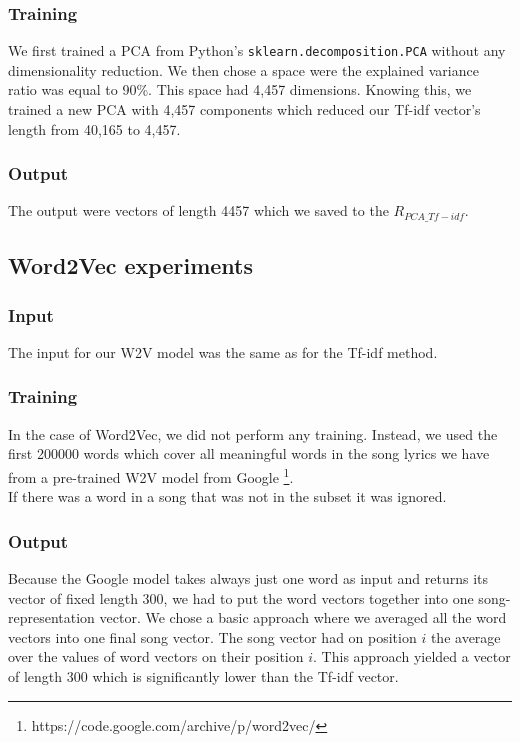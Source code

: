\subsubsection{Training}
We first trained a PCA from Python's \texttt{sklearn.decomposition.PCA} without any dimensionality reduction. We then chose a space were the explained variance ratio was equal to 90\%. This space had 4,457 dimensions. Knowing this, we trained a new PCA with 4,457 components which reduced our Tf-idf vector's length from 40,165 to 4,457.

\subsubsection{Output}
The output were vectors of length 4457 which we saved to the $R_{PCA\_Tf-idf}$.

\subsection{Word2Vec experiments}\label{ssec:w2v_experiments}

\subsubsection{Input}
The input for our W2V model was the same as for the Tf-idf method.

\subsubsection{Training}
In the case of Word2Vec, we did not perform any training. Instead, we used the first 200000 words which cover all meaningful words in the song lyrics we have from a pre-trained W2V model from Google \footnote{https://code.google.com/archive/p/word2vec/}. \\
If there was a word in a song that was not in the subset it was ignored. 

\subsubsection{Output}
Because the Google model takes always just one word as input and returns its vector of fixed length 300, we had to put the word vectors together into one song-representation vector. We chose a basic approach where we averaged all the word vectors into one final song vector. The song vector had on position $i$ the average over the values of word vectors on their position $i$. This approach yielded a vector of length 300 which is significantly lower than the Tf-idf vector.\\

